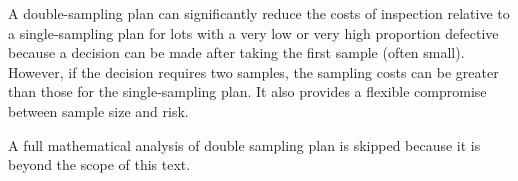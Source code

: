 \documentclass[twoside]{book}
\begin{document}
A double-sampling plan can significantly reduce the costs of inspection relative to a single-sampling plan for lots with a very low or very high proportion defective because a decision can be made after taking the first sample (often small). However, if the decision requires two samples, the sampling costs can be greater than those for the single-sampling plan. It also provides a flexible compromise between sample size and risk.

A full mathematical analysis of double sampling plan is skipped because it is beyond the scope of this text.

%
%
%
%
%
\end{document}
